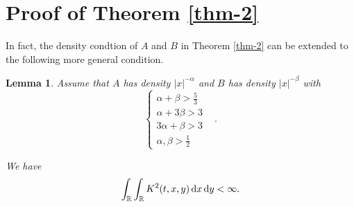 \documentclass[12pt]{amsart}
\def\d{{\,\rm d}}
\newtheorem{lemma}[proposition]{Lemma}
\theoremstyle{definition}
\numberwithin{equation}{section}
\begin{document}
\section{Proof of Theorem \ref{thm-2}}
In fact, the density condtion of $A$ and $B$ in Theorem \ref{thm-2} can be extended to the following more general condition.
\begin{lemma}
    Assume that $A$ has density $|x|^{-\alpha}$ and $B$ has density $|x|^{-\beta}$ with 
    $$
       \begin{cases}
          \alpha+\beta>\frac{5}{3}&\\
          \alpha+3\beta>3&\\
          3\alpha+\beta>3&\\
          \alpha,\beta>\frac{1}{2}&
       \end{cases}.
    $$
    
    We have
    $$
       \int_{\mathbb{R}}\int_{\mathbb{R}}K^2(t,x,y)\d x\d y<\infty.
    $$
 \end{lemma}
\end{document}
